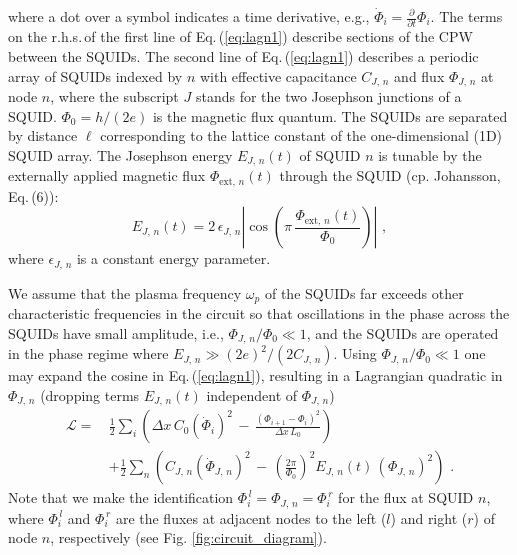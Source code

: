 %
where a dot over a symbol indicates a time derivative, e.g., 
$\displaystyle \dot{\Phi}_i = \frac{\partial}{\partial t} \Phi_i$.
The terms on the r.h.s.\,of the first line of Eq.\,(\ref{eq:lagn1}) describe sections of the CPW between the SQUIDs. 
The second line of Eq.\,(\ref{eq:lagn1}) describes a periodic array of SQUIDs indexed by $n$ 
with effective capacitance $C_{J,\,n}$ and flux $\Phi_{J,\,n}$ at node $n$, where 
the subscript $J$ stands for the two Josephson junctions of a SQUID.
$\Phi_0 = h / (2 e)$ is the magnetic flux quantum.
The SQUIDs are separated by 
distance $\ell$ corresponding to the lattice constant of the one-dimensional (1D) SQUID array. 
The Josephson energy $E_{J,\,n}(t)$ of SQUID $n$ is tunable
by the externally applied magnetic flux $\Phi_{\text{ext},\,n}(t)$ through the SQUID 
(cp. Johansson, Eq.\,(6)): 
%
\begin{equation} \label{eq:squidenergy}
    E_{J,\,n}(t) = 2 \, \epsilon_{J,\,n} 
    \left\vert \cos\left(\pi \, \frac{\Phi_{\text{ext},\,n}(t)}{\Phi_0}\right)\right\vert \, \, ,
\end{equation}
%
where $\epsilon_{J,\,n}$ is a constant energy parameter.

We assume that the plasma frequency $\omega_p$ of the SQUIDs far exceeds other characteristic frequencies 
in the circuit so that oscillations in the phase across the SQUIDs have small amplitude, i.e., 
$\Phi_{J,\,n} / \Phi_0 \ll 1$,
and the SQUIDs are operated in the phase regime where $E_{J,\,n} \gg (2e)^2 / (2C_{J,\,n})$. 
Using $\Phi_{J,\,n} / \Phi_0 \ll 1$ one may expand the cosine in Eq.\,(\ref{eq:lagn1}), 
resulting in a Lagrangian quadratic in $\Phi_{J,\,n}$ (dropping terms $E_{J,\,n}(t)$ 
independent of $\Phi_{J,\,n}$)
%
\begin{equation} \label{eq:lagn2}
\begin{split}
\mathcal{L} = \, & \frac{1}{2} \sum_i \left( \Delta x \, C_{0} \left(\dot{\Phi}_{i}\right)^{2} \, - \, 
\frac{\left(\Phi_{i+1}-\Phi_{i}\right)^{2}}{\Delta x \, L_{0}} \right)  \\[2mm]
& + \frac{1}{2} \sum_n \left( C_{J,\,n} \left(\dot{\Phi}_{J,\,n} \right)^{2} \, - \, 
 \left(\frac{2 \pi}{\Phi_0} \right)^2 E_{J,\,n}(t) \, \left( \Phi_{J,\,n} \right)^2 
\right) \, \, .
\end{split}
\end{equation}
%
Note that we make the identification $\Phi_i^{\,l} = \Phi_{J,\,n} = \Phi_i^{\,r}$ for the flux at SQUID $n$, 
where $\Phi_i^{\,l}$ and $\Phi_i^{\,r}$ are the fluxes at adjacent nodes to the left ($l$) and right ($r$) of 
node $n$, respectively (see Fig. \ref{fig:circuit_diagram}). 


